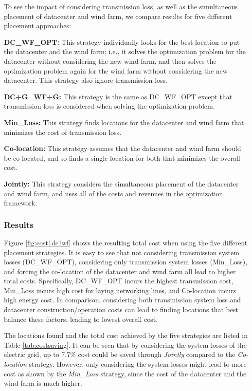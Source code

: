To see the impact of considering transmission loss, as well as the simultaneous placement of datacenter and wind farm, we compare results for five different placement approaches:

\textbf{DC\_WF\_OPT:} This strategy individually looks for the best location to put the datacenter and the wind farm; i.e., it solves the optimization problem for the datacenter without considering the new wind farm, and then solves the optimization problem again for the wind farm without considering the new datacenter.  This strategy also ignore transmission loss.

\textbf{DC+G\_WF+G:} This strategy is the same as DC\_WF\_OPT except that transmission loss is considered when solving the optimization problem.

\textbf{Min\_Loss:} This strategy finds locations for the datacenter and wind farm that minimizes the cost of transmission loss.

\textbf{Co-location:} This strategy assumes that the datacenter and wind farm
should be co-located, and so finds a single location for both that minimizes the overall cost.

\textbf{Jointly:} This strategy considers the simultaneous placement of the datacenter and wind farm, and uses all of the costs and revenues in the optimization framework.

\subsubsection{Results}
Figure \ref{fig:cost1dc1wf} shows the resulting total cost when using
the five different placement strategies.  It is easy to see that not
considering transmission system losses (DC\_WF\_OPT), considering only
transmission system losses (Min\_Loss), and forcing the co-location of
the datacenter and wind farm all lead to higher total costs.
Specifically, DC\_WF\_OPT incurs the highest transmission cost,
Min\_Loss incurs high cost for laying networking lines, and
Co-location incurs high energy cost.  In comparison, considering both
transmission system loss and datacenter construction/operation costs
can lead to finding locations that best balance these factors, leading
to lowest overall cost.

The locations found and the total cost achieved by the five
strategies are listed in Table \ref{tab:costsaving}. It can be seen that 
by considering the system losses of the electric grid, up to 7.7\% cost could be saved 
through {\em Jointly} compared to the {\em Co-location} strategy. However, only considering
the system losses might lead to more cost as shown by the {\em Min\_Loss} strategy, since
the cost of the datacenter and the wind farm is much higher.

